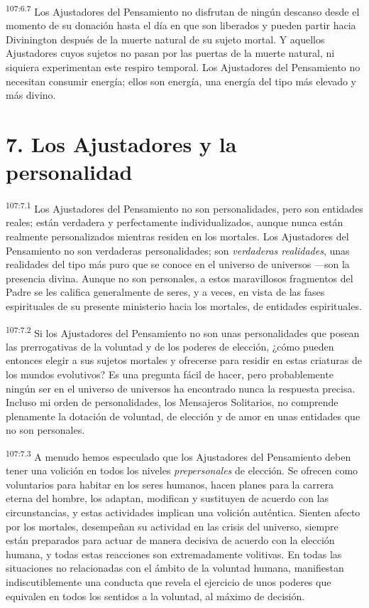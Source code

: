 \par
\textsuperscript{107:6.7} Los Ajustadores del Pensamiento no disfrutan de ningún descanso desde el momento de su donación hasta el día en que son liberados y pueden partir hacia Divinington después de la muerte natural de su sujeto mortal. Y aquellos Ajustadores cuyos sujetos no pasan por las puertas de la muerte natural, ni siquiera experimentan este respiro temporal. Los Ajustadores del Pensamiento no necesitan consumir energía; ellos son energía, una energía del tipo más elevado y más divino.

\section*{7. Los Ajustadores y la personalidad}
\par
\textsuperscript{107:7.1} Los Ajustadores del Pensamiento no son personalidades, pero son entidades reales; están verdadera y perfectamente individualizados, aunque nunca están realmente personalizados mientras residen en los mortales. Los Ajustadores del Pensamiento no son verdaderas personalidades; son \textit{verdaderas realidades}, unas realidades del tipo más puro que se conoce en el universo de universos ---son la presencia divina. Aunque no son personales, a estos maravillosos fragmentos del Padre se les califica generalmente de seres, y a veces, en vista de las fases espirituales de su presente ministerio hacia los mortales, de entidades espirituales.

\par
\textsuperscript{107:7.2} Si los Ajustadores del Pensamiento no son unas personalidades que posean las prerrogativas de la voluntad y de los poderes de elección, ¿cómo pueden entonces elegir a sus sujetos mortales y ofrecerse para residir en estas criaturas de los mundos evolutivos? Es una pregunta fácil de hacer, pero probablemente ningún ser en el universo de universos ha encontrado nunca la respuesta precisa. Incluso mi orden de personalidades, los Mensajeros Solitarios, no comprende plenamente la dotación de voluntad, de elección y de amor en unas entidades que no son personales.

\par
\textsuperscript{107:7.3} A menudo hemos especulado que los Ajustadores del Pensamiento deben tener una volición en todos los niveles \textit{prepersonales} de elección. Se ofrecen como voluntarios para habitar en los seres humanos, hacen planes para la carrera eterna del hombre, los adaptan, modifican y sustituyen de acuerdo con las circunstancias, y estas actividades implican una volición auténtica. Sienten afecto por los mortales, desempeñan su actividad en las crisis del universo, siempre están preparados para actuar de manera decisiva de acuerdo con la elección humana, y todas estas reacciones son extremadamente volitivas. En todas las situaciones no relacionadas con el ámbito de la voluntad humana, manifiestan indiscutiblemente una conducta que revela el ejercicio de unos poderes que equivalen en todos los sentidos a la voluntad, al máximo de decisión.


